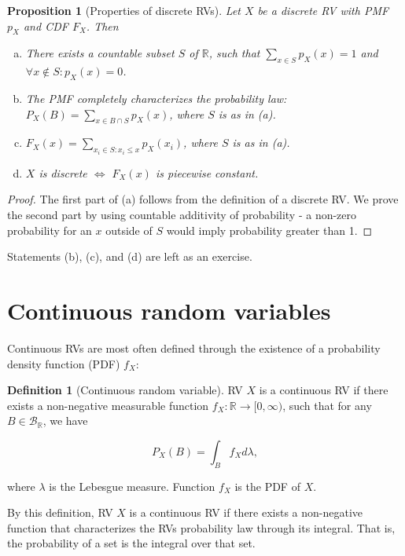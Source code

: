 \documentclass{book}
\theoremstyle{plain}%
\newtheorem{proposition}{Proposition}[section]
\theoremstyle{definition}
\newtheorem{definition}{Definition}[section]
\newlength{\arrow}
\begin{document}
\begin{proposition}[Properties of discrete RVs]

Let $X$ be a discrete RV with PMF $p_X$ and CDF $F_X$. Then

\vspace{0.1pt}
\begin{enumerate}[(a)]
\item There exists a countable subset $S$ of $\mathbb{R}$, such that $\sum_{x \in S} p_X(x) = 1$ and $\forall x \notin S: p_X(x) = 0$.
\item The PMF completely characterizes the probability law: $P_X(B) = \sum_{x \in B \cap S} p_X(x)$, where $S$ is as in \textit{(a)}.
\item $F_X(x) = \sum_{x_i \in S: x_i \leq x} p_X(x_i)$, where $S$ is as in \textit{(a)}.
\item $X$ is discrete $\Longleftrightarrow$ $F_X(x)$ is piecewise constant.
\end{enumerate}\label{prop:pmf}
\end{proposition}

\begin{proof}
The first part of (a) follows from the definition of a discrete RV. We prove the second part by using countable additivity of probability - a non-zero probability for an $x$ outside of $S$ would imply probability greater than 1.
\end{proof}


Statements (b), (c), and (d) are left as an exercise.

\section{Continuous random variables}\label{ch:continuous}

Continuous RVs are most often defined through the existence of a probability density function (PDF) $f_X$:

\begin{definition}[Continuous random variable]
RV $X$ is a continuous RV if there exists a non-negative measurable function $f_X:\mathbb{R} \rightarrow [0, \infty)$, such that for any $B \in \mathcal{B}_\mathbb{R}$, we have

$$P_X(B) = \int_B f_X d\lambda,$$

where $\lambda$ is the Lebesgue measure. Function $f_X$ is the PDF of $X$.\label{def:rv}
\end{definition}

By this definition, RV $X$ is a continuous RV if there exists a non-negative function that characterizes the RVs probability law through its integral. That is, the probability of a set is the integral over that set.
\end{document}
